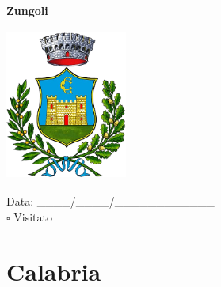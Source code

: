 \documentclass[a5paper,12pt]{article}
\begin{document}
\newpage

\noindent
\begin{minipage}[t]{0.45\textwidth}
    \begin{center}
        \textbf{Zungoli}
    \end{center}
    \vspace{-0.5cm} %
    \begin{center}
        \includegraphics[height= 5cm, width=4cm]{Campania/Zungoli-Stemma.png}
    \end{center}
    \vspace{-0.4cm} %
    \begin{flushleft}
        Data: \_\_\_\_/\_\_\_\_/\_\_\_\_\_\_\_\_\_\_\_\_ \\
        $\square$ Visitato
    \end{flushleft}
\end{minipage}

\newpage

\section*{Calabria}

\newpage
\end{document}
